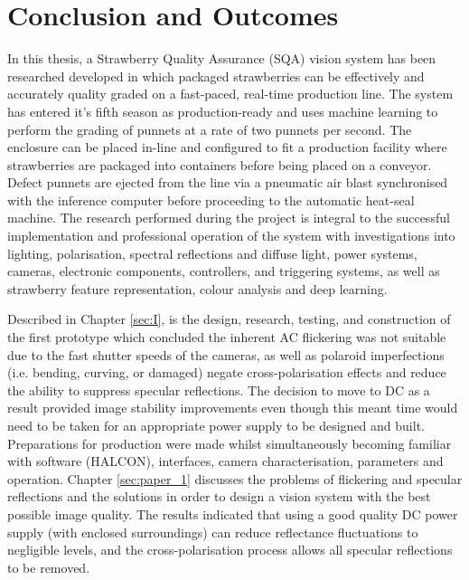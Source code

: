 \documentclass[fleqn,twoside,12pt]{report}
\begin{document}
\newpage

\chapter{Conclusion and Outcomes}


In this thesis, a Strawberry Quality Assurance (SQA) vision system has been researched developed in which packaged strawberries can be effectively and accurately quality graded on a fast-paced, real-time production line. The system has entered it's fifth season as production-ready and uses machine learning to perform the grading of punnets at a rate of two punnets per second. The enclosure can be placed in-line and configured to fit a production facility where strawberries are packaged into containers before being placed on a conveyor. Defect punnets are ejected from the line via a pneumatic air blast synchronised with the inference computer before proceeding to the automatic heat-seal machine. The research performed during the project is integral to the successful implementation and professional operation of the system with investigations into lighting, polarisation, spectral reflections and diffuse light, power systems, cameras, electronic components, controllers, and triggering systems, as well as strawberry feature representation, colour analysis and deep learning. 

Described in Chapter \ref{sec:I}, is the design, research, testing, and construction of the first prototype which concluded the inherent AC flickering was not suitable due to the fast shutter speeds of the cameras, as well as polaroid imperfections (i.e. bending, curving, or damaged) negate cross-polarisation effects and reduce the ability to suppress specular reflections. The decision to move to DC as a result provided image stability improvements even though this meant time would need to be taken for an appropriate power supply to be designed and built. Preparations for production were made whilst simultaneously becoming familiar with software (HALCON\texttrademark), interfaces, camera characterisation, parameters and operation. Chapter \ref{sec:paper_1} discusses the problems of flickering and specular reflections and the solutions in order to design a vision system with the best possible image quality. The results indicated that using a good quality DC power supply (with enclosed surroundings) can reduce reflectance fluctuations to negligible levels, and the cross-polarisation process allows all specular reflections to be removed. 
\end{document}
